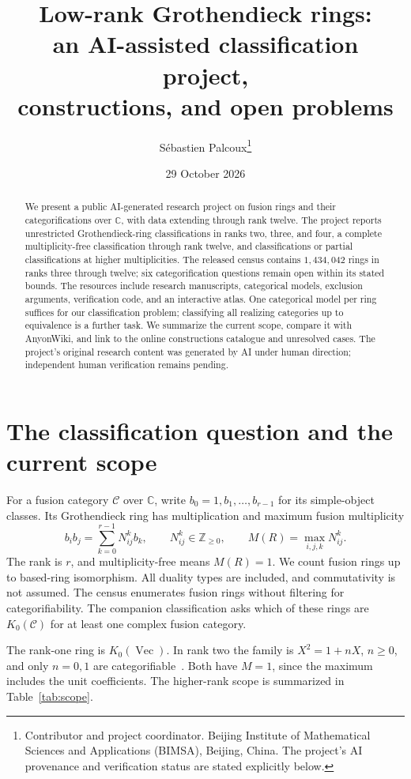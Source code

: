 \documentclass[11pt,a4paper]{article}
\title{\vspace{-12mm}\textbf{Low-rank Grothendieck rings:}\\[3pt]
an AI-assisted classification project,\\ constructions, and open problems}
\author{S\'ebastien Palcoux\thanks{Contributor and project coordinator. Beijing Institute of Mathematical Sciences and Applications (BIMSA), Beijing, China. The project's AI provenance and verification status are stated explicitly below.}}
\date{29 October 2026}
\newcommand{\Vect}{\operatorname{Vec}}
\begin{document}
\maketitle
\vspace{-5mm}
\begin{abstract}
We present a public AI-generated research project on fusion rings and their
categorifications over $\mathbb C$, with data extending through rank twelve.
The project reports unrestricted Grothendieck-ring classifications in ranks
two, three, and four, a complete multiplicity-free classification through
rank twelve, and classifications or partial classifications at higher
multiplicities. The released census contains $1{,}434{,}042$ rings in ranks
three through twelve; six categorification questions remain open within
its stated bounds. The resources include research manuscripts, categorical
models, exclusion arguments, verification code, and an interactive atlas.
One categorical model per ring suffices for our classification problem;
classifying all realizing categories up to equivalence is a further task.
We summarize the current scope, compare it with AnyonWiki, and link to the
online constructions catalogue and unresolved cases.
The project's original research content was generated by AI under human
direction; independent human verification remains pending.
\end{abstract}

\section{The classification question and the current scope}
For a fusion category $\mathcal C$ over $\mathbb C$, write
$b_0=1,b_1,\ldots,b_{r-1}$ for its simple-object classes. Its Grothendieck
ring has multiplication and maximum fusion multiplicity
\[
 b_i b_j=\sum_{k=0}^{r-1}N_{ij}^{k}b_k,
 \qquad N_{ij}^{k}\in\mathbb Z_{\geq0},
 \qquad M(R)=\max_{i,j,k}N_{ij}^{k}.
\]
The rank is $r$, and multiplicity-free means $M(R)=1$. We count fusion rings
up to based-ring isomorphism. All duality types are included, and
commutativity is not assumed. The census enumerates fusion rings without
filtering for categorifiability. The companion classification asks which
of these rings are $K_0(\mathcal C)$ for at least one complex fusion category.

The rank-one ring is $K_0(\Vect)$. In rank two the family is
$X^2=1+nX$, $n\geq0$, and only $n=0,1$ are categorifiable~\cite{Ostrik2}.
Both have $M=1$, since the maximum includes the unit coefficients.
The higher-rank scope is summarized in Table~\ref{tab:scope}.
\end{document}
